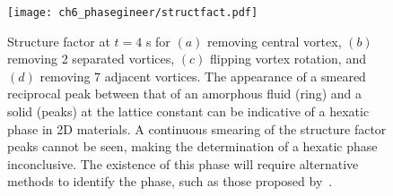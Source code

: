 \begin{figure}\centering
    \texttt{[image: ch6\_phasegineer/structfact.pdf]}
    \caption{Structure factor at $t=4$ s for $(a)$ removing central vortex, $(b)$ removing 2 separated vortices, $(c)$ flipping vortex rotation, and $(d)$ removing 7 adjacent vortices. The appearance of a smeared reciprocal peak between that of an amorphous fluid (ring) and a solid (peaks) at the lattice constant can be indicative of a hexatic phase in 2D materials. A continuous smearing of the structure factor peaks cannot be seen, making the determination of a hexatic phase inconclusive. The existence of this phase will require alternative methods to identify the phase, such as those proposed by~\cite{CM:Bruun_prb_2014,CM:Lechner_prl_2014}.}\label{fig:struct_fact}
\end{figure}
